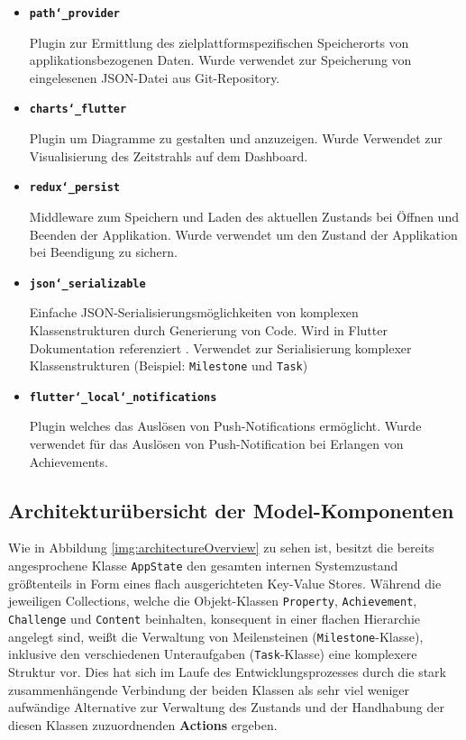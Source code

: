 \documentclass[bibliography=totoc,listof=totoc,BCOR=5mm,DIV=12,oneside]{scrbook}
\begin{document}
\begin{itemize}
\item \textbf{\texttt{path\char`_provider}} \citep{PathProvider}
\par Plugin zur Ermittlung des zielplattformspezifischen Speicherorts von applikationsbezogenen Daten. Wurde verwendet zur Speicherung von eingelesenen JSON-Datei aus Git-Repository.

\item \textbf{\texttt{charts\char`_flutter}} \citep{chartsFlutter}
\par Plugin um Diagramme zu gestalten und anzuzeigen. Wurde Verwendet zur Visualisierung des Zeitstrahls auf dem Dashboard.

\item \textbf{\texttt{redux\char`_persist}} \citep{ReduxPersist}
\par Middleware zum Speichern und Laden des aktuellen Zustands bei Öffnen und Beenden der Applikation. Wurde verwendet um den Zustand der Applikation bei Beendigung zu sichern.

\item \textbf{\texttt{json\char`_serializable}} \citep{JSONSerializable} 
\par Einfache JSON-Serialisierungsmöglichkeiten von komplexen Klassenstrukturen durch Generierung von Code. Wird in Flutter Dokumentation referenziert \citep{FlutterJSONSerializable}. Verwendet zur Serialisierung komplexer Klassenstrukturen (Beispiel: \texttt{Milestone} und \texttt{Task})

\item \textbf{\texttt{flutter\char`_local\char`_notifications}} \citep{FlutterLocalNotificationPlugin}
\par Plugin welches das Auslösen von Push-Notifications ermöglicht. Wurde verwendet für das Auslösen von Push-Notification bei Erlangen von Achievements.

\end{itemize}

\newpage
\subsection{Architekturübersicht der Model-Komponenten}
Wie in Abbildung \ref{img:architectureOverview} zu sehen ist, besitzt die bereits angesprochene Klasse \texttt{AppState} den gesamten internen Systemzustand größtenteils in Form eines flach ausgerichteten Key-Value Stores. Während die jeweiligen Collections, welche die Objekt-Klassen \texttt{Property}, \texttt{Achievement}, \texttt{Challenge} und \texttt{Content} beinhalten, konsequent in einer flachen Hierarchie angelegt sind, weißt die Verwaltung von Meilensteinen (\texttt{Milestone}-Klasse), inklusive den verschiedenen Unteraufgaben (\texttt{Task}-Klasse) eine komplexere Struktur vor. Dies hat sich im Laufe des Entwicklungsprozesses durch die stark zusammenhängende Verbindung der beiden Klassen als sehr viel weniger aufwändige Alternative zur Verwaltung des Zustands und der Handhabung der diesen Klassen zuzuordnenden \textbf{Actions} ergeben.
\end{document}
